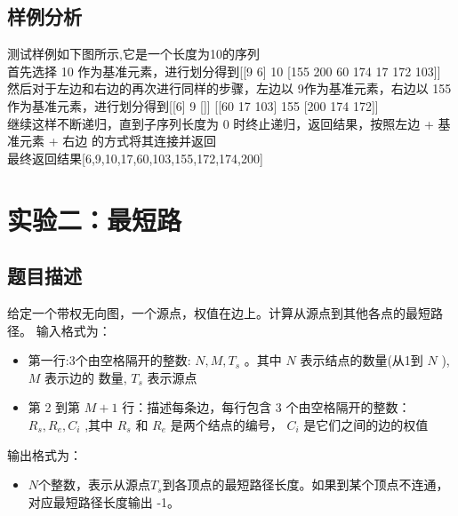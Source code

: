 \documentclass[UTF8,a4paperdui, %
]{ctexart}
\begin{document}
\subsection{样例分析}
测试样例如下图所示,它是一个长度为10的序列
\\
首先选择 10 作为基准元素，进行划分得到[[9 6] 10 [155 200 60 174 17 172 103]]\\
然后对于左边和右边的再次进行同样的步骤，左边以 9作为基准元素，右边以 155 作为基准元素，进行划分得到[[6] 9 []] [[60 17 103] 155 [200 174 172]]\\
继续这样不断递归，直到子序列长度为 0 时终止递归，返回结果，按照左边 + 基准元素 + 右边 的方式将其连接并返回\\
最终返回结果[6,9,10,17,60,103,155,172,174,200]

\newpage
\section{实验二：最短路}

\subsection{题目描述}
给定一个带权无向图，一个源点，权值在边上。计算从源点到其他各点的最短路径。
输入格式为：
\begin{itemize}
    \item 第一行:3个由空格隔开的整数: $N, M, T_s$ 。其中 $N$ 表示结点的数量(从1到 $N$ ), $M$ 表示边的 数量, $T_s$ 表示源点
    \item  第 2 到第 $M+1$ 行：描述每条边，每行包含 3 个由空格隔开的整数： $R_s, R_e, C_i$ ,其中 $R_s$ 和 $R_e$ 是两个结点的编号， $C_i$ 是它们之间的边的权值
\end{itemize}
输出格式为：
\begin{itemize}
    \item $N$个整数，表示从源点$T_s$到各顶点的最短路径长度。如果到某个顶点不连通，对应最短路径长度输出 -1。
\end{itemize}
\end{document}
